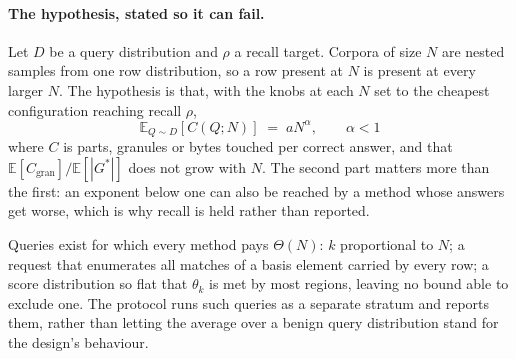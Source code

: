 \paragraph{The hypothesis, stated so it can fail.}
Let $D$ be a query distribution and $\rho$ a recall target. Corpora of size $N$
are nested samples from one row distribution, so a row present at $N$ is
present at every larger $N$. The hypothesis is that, with the knobs at each $N$
set to the cheapest configuration reaching recall $\rho$,
\[
  \mathbb{E}_{Q \sim D}\!\left[C(Q;N)\right] \;=\; a N^{\alpha},
  \qquad \alpha < 1
\]
where $C$ is parts, granules or bytes touched per correct answer, and that
$\mathbb{E}[C_{\mathrm{gran}}] / \mathbb{E}[|G^{*}|]$ does not grow with $N$.
The second part matters more than the first: an exponent below one can also be
reached by a method whose answers get worse, which is why recall is held rather
than reported.

\begin{remark}
Queries exist for which every method pays $\Theta(N)$: $k$ proportional to $N$;
a request that enumerates all matches of a basis element carried by every row;
a score distribution so flat that $\theta_k$ is met by most regions, leaving no
bound able to exclude one. The protocol runs such queries as a separate stratum
and reports them, rather than letting the average over a benign query
distribution stand for the design's behaviour.
\end{remark}
